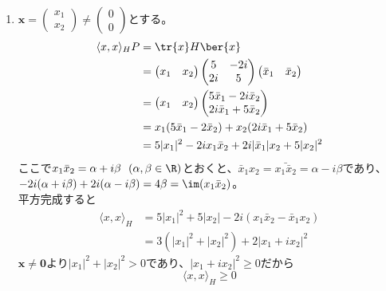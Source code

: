 \begin{souanswer}
\begin{enumerate}
\begin{itemize}
    このとき$P$はユニタリ行列であり、
\begin{equation*}
    D= P^{-1}HP= \begin{pmatrix}7& 0\\ 0& 3\end{pmatrix}
\end{equation*}
    となる。
\end{itemize}
    \item $\bm{x}= \begin{pmatrix}x_1\\ x_2\end{pmatrix}\ne \begin{pmatrix}0\\ 0\end{pmatrix}$とする。
\begin{align*}
    \langle{x, x}\rangle_HP
    &= \tr{x}H\ber{x}\\
    &= \begin{pmatrix}x_1& x_2\end{pmatrix}\begin{pmatrix}5& -2i\\ 2i& 5\end{pmatrix}\begin{pmatrix}\bar{x}_1& \bar{x}_2\end{pmatrix}\\
    &= \begin{pmatrix}x_1& x_2\end{pmatrix}\begin{pmatrix}5\bar{x}_1- 2i\bar{x}_2\\ 2i\bar{x}_1+ 5\bar{x}_2\end{pmatrix}\\
    &= x_1(5\bar{x}_1- 2\bar{x}_2)+ x_2(2i\bar{x}_1+ 5\bar{x}_2)\\
    &= 5|x_1|^2- 2ix_1\bar{x}_2+ 2i|\bar{x}_1|x_2+ 5|x_2|^2
\end{align*}
    ここで$x_1\bar{x}_2= \alpha+ i\beta\ \ (\alpha, \beta\in \R)$とおくと、$\bar{x}_1x_2= \bar{x_1\bar{x}_2}= \alpha- i\beta$であり、$-2i(\alpha+ i\beta)+ 2i(\alpha- i\beta)= 4\beta= \im(x_1\bar{x}_2)$。\\
    平方完成すると
\begin{align*}
    \langle{x, x}\rangle_H
    &= 5|x_1|^2+ 5|x_2|- 2i(x_1\bar{x}_2- \bar{x}_1x_2)\\
    &= 3(|x_1|^2+ |x_2|^2)+ 2|x_1+ ix_2|^2
\end{align*}
    $\bm{x}\ne \bm{0}$より$|x_1|^2+ |x_2|^2> 0$であり、$|x_1+ ix_2|^2\ge 0$だから
\begin{equation*}
    \langle{x, x}\rangle_H\ge 0
\end{equation*}
\end{enumerate}
\end{souanswer}
